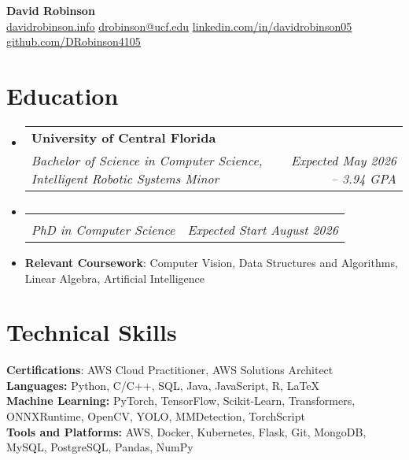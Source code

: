 \documentclass[letterpaper,11pt]{article}
\makeatletter
\newcommand{\educationItem}[1]{
  \item\small{
    {#1 \vspace{-5pt}}
  }
}
\newcommand{\resumeSubheading}[4]{
  \vspace{-2pt}\item
    \begin{tabular*}{0.97\textwidth}[t]{l@{\extracolsep{\fill}}r}
      \textbf{#1} & #2 \\
      \textit{\small#3} & \textit{\small #4} \\
    \end{tabular*}\vspace{-7pt}
}
\newcommand{\resumeSubHeadingListStart}{\begin{itemize}[leftmargin=0.15in, label={}]}
\newcommand{\resumeSubHeadingListEnd}{\end{itemize}}
\makeatother
\begin{document}
\begin{center}
  \textbf{\Huge David Robinson} \\ \vspace{2pt} \small
  \faCode\hspace{0.25pt} \href{https://www.davidrobinson.info/}{\uline{davidrobinson.info}}
  \faEnvelope\hspace{0.25pt} \href{mailto:drobinson@ucf.edu}{\uline{drobinson@ucf.edu}}
  \faLinkedin\hspace{0.25pt} \href{https://linkedin.com/in/davidrobinson05}{\uline{linkedin.com/in/davidrobinson05}}
  \faGithub\hspace{0.25pt} \href{https://github.com/DRobinson4105}{\uline{github.com/DRobinson4105}}
\end{center}

\section{Education}
  \resumeSubHeadingListStart
    \resumeSubheading
      {University of Central Florida}{}
      {Bachelor of Science in Computer Science, Intelligent Robotic Systems Minor}{Expected May 2026 -- 3.94 GPA}
      \resumeSubheading
        {\vspace{-1.5em}}{}
        {PhD in Computer Science}{Expected Start August 2026}
    \educationItem{\textbf{Relevant Coursework}: Computer Vision, Data Structures and Algorithms, Linear Algebra, Artificial Intelligence}
  \resumeSubHeadingListEnd

\section{Technical Skills}
  \begin{itemize}[leftmargin=0.15in, label={}]
    \small{\item{
      \textbf{Certifications}: AWS Cloud Practitioner, AWS Solutions Architect \\
      \textbf{Languages:}{ Python, C/C++, SQL, Java, JavaScript, R, LaTeX} \\
      \textbf{Machine Learning:}{ PyTorch, TensorFlow, Scikit-Learn, Transformers, ONNXRuntime, OpenCV, YOLO, MMDetection, TorchScript} \\
      \textbf{Tools and Platforms:}{ AWS, Docker, Kubernetes, Flask, Git, MongoDB, MySQL, PostgreSQL, Pandas, NumPy}
    }}
  \end{itemize}
\end{document}
